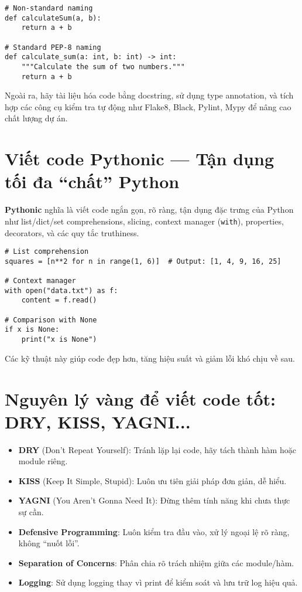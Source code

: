 \begin{lstlisting}[caption={Ví dụ đặt tên và định dạng theo PEP-8}]
# Non-standard naming
def calculateSum(a, b):
    return a + b

# Standard PEP-8 naming
def calculate_sum(a: int, b: int) -> int:
    """Calculate the sum of two numbers."""
    return a + b
\end{lstlisting}

Ngoài ra, hãy tài liệu hóa code bằng docstring, sử dụng type annotation, và tích hợp các công cụ kiểm tra tự động như Flake8, Black, Pylint, Mypy để nâng cao chất lượng dự án.

\section{Viết code Pythonic --- Tận dụng tối đa ``chất'' Python}
\textbf{Pythonic} nghĩa là viết code ngắn gọn, rõ ràng, tận dụng đặc trưng của Python như list/dict/set comprehensions, slicing, context manager (\texttt{with}), properties, decorators, và các quy tắc truthiness.

\begin{lstlisting}[caption={Ví dụ code Pythonic}]
# List comprehension
squares = [n**2 for n in range(1, 6)]  # Output: [1, 4, 9, 16, 25]

# Context manager
with open("data.txt") as f:
    content = f.read()

# Comparison with None
if x is None:
    print("x is None")
\end{lstlisting}

Các kỹ thuật này giúp code đẹp hơn, tăng hiệu suất và giảm lỗi khó chịu về sau.

\section{Nguyên lý vàng để viết code tốt: DRY, KISS, YAGNI...}
\begin{itemize}
    \item \textbf{DRY} (Don't Repeat Yourself): Tránh lặp lại code, hãy tách thành hàm hoặc module riêng.
    \item \textbf{KISS} (Keep It Simple, Stupid): Luôn ưu tiên giải pháp đơn giản, dễ hiểu.
    \item \textbf{YAGNI} (You Aren't Gonna Need It): Đừng thêm tính năng khi chưa thực sự cần.
    \item \textbf{Defensive Programming}: Luôn kiểm tra đầu vào, xử lý ngoại lệ rõ ràng, không ``nuốt lỗi''.
    \item \textbf{Separation of Concerns}: Phân chia rõ trách nhiệm giữa các module/hàm.
    \item \textbf{Logging}: Sử dụng logging thay vì print để kiểm soát và lưu trữ log hiệu quả.
\end{itemize}

